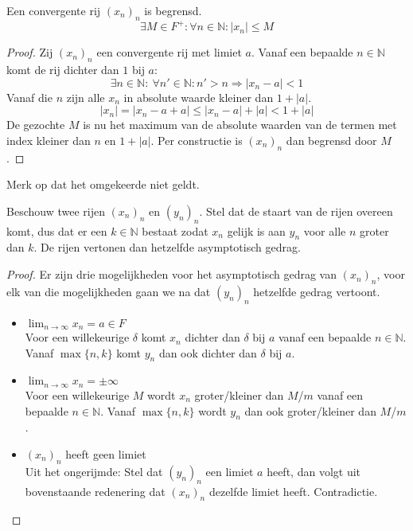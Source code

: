 \documentclass[main.tex]{subfiles}
\begin{document}
\begin{pr}
  \label{pr:convergente-rij-begrensd}
  Een convergente rij $(x_{n})_{n}$ is begrensd.
  \[ \exists M \in F^{+}: \forall n\in \mathbb{N}: |x_{n}| \le M \]

  \begin{proof}
    Zij $(x_{n})_{n}$ een convergente rij met limiet $a$.
    Vanaf een bepaalde $n\in \mathbb{N}$ komt de rij dichter dan $1$ bij $a$:
    \[ \exists n\in \mathbb{N}:\ \forall n'\in \mathbb{N}: n'>n\Rightarrow |x_{n}-a|<1 \]
    Vanaf die $n$ zijn alle $x_{n}$ in absolute waarde kleiner dan $1+|a|$.
    \[ |x_{n}| = |x_{n}-a+a| \le |x_{n}-a|+|a| <1+|a| \]
    De gezochte $M$ is nu het maximum van de absolute waarden van de termen met index kleiner dan $n$ en $1+|a|$.
    Per constructie is $(x_{n})_{n}$ dan begrensd door $M$.
  \end{proof}
\end{pr}

\begin{opm}
  Merk op dat het omgekeerde niet geldt.
\end{opm}

\begin{pr}
  Beschouw twee rijen $(x_{n})_{n}$ en $(y_{n})_{n}$.
  Stel dat de staart van de rijen overeen komt, dus dat er een $k\in \mathbb{N}$ bestaat zodat $x_{n}$ gelijk is aan $y_{n}$ voor alle $n$ groter dan $k$.
  De rijen vertonen dan hetzelfde asymptotisch gedrag.
  \begin{proof}
    Er zijn drie mogelijkheden voor het asymptotisch gedrag van $(x_{n})_{n}$, voor elk van die mogelijkheden gaan we na dat $(y_{n})_{n}$ hetzelfde gedrag vertoont.
    \begin{itemize}
    \item $\lim_{n \rightarrow \infty}x_{n} = a\in F$\\
      Voor een willekeurige $\delta$ komt $x_{n}$ dichter dan $\delta$ bij $a$ vanaf een bepaalde $n\in \mathbb{N}$.
      Vanaf $\max\{n,k\}$ komt $y_{n}$ dan ook dichter dan $\delta$ bij $a$.
    \item $\lim_{n \rightarrow \infty}x_{n} = \pm \infty$\\
      Voor een willekeurige $M$ wordt $x_{n}$ groter/kleiner dan $M$/$m$ vanaf een bepaalde $n\in \mathbb{N}$.
      Vanaf $\max\{n,k\}$ wordt $y_{n}$ dan ook groter/kleiner dan $M$/$m$.
    \item $(x_{n})_{n}$ heeft geen limiet\\
      Uit het ongerijmde:
      Stel dat $(y_{n})_{n}$ een limiet $a$ heeft, dan volgt uit bovenstaande redenering dat $(x_{n})_{n}$ dezelfde limiet heeft.
      Contradictie.
    \end{itemize}
  \end{proof}

\end{pr}
\end{document}
